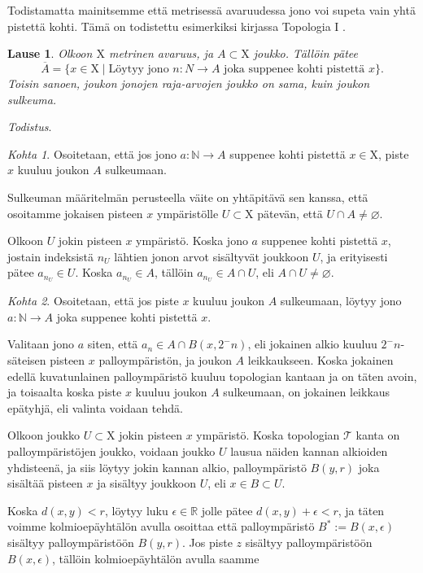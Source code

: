\documentclass[12pt,a4paper,leqno]{report}
\newcommand{\R}{\mathbb{R}}
\newcommand{\N}{\mathbb{N}}
\newcommand{\X}{\mathrm{X}}
\newcommand{\T}{\mathcal{T}}
\theoremstyle{plain}
\newtheorem{lause}[equation]{Lause}
\theoremstyle{definition}
\theoremstyle{remark}
\begin{document}
Todistamatta mainitsemme että metrisessä avaruudessa jono voi supeta vain yhtä pistettä kohti. Tämä on todistettu esimerkiksi kirjassa Topologia I \cite{Topo1}.

\begin{lause}
Olkoon $\X$ metrinen avaruus, ja $A \subset \X$ joukko. Tällöin pätee
\begin{equation}
\overline{A} = \{x \in \X \mid \text{Löytyy jono } n : N \to A \text{ joka suppenee kohti pistettä } x\}\text{.}
\end{equation}
Toisin sanoen, joukon jonojen raja-arvojen joukko on sama, kuin joukon sulkeuma.
\end{lause}

\noindent\emph{Todistus}.

\emph{Kohta 1}. Osoitetaan, että jos jono $a : \N \to A$ suppenee kohti pistettä $x \in \X$, piste $x$ kuuluu joukon $A$ sulkeumaan.

Sulkeuman määritelmän perusteella väite on yhtäpitävä sen kanssa, että osoitamme jokaisen pisteen $x$ ympäristölle $U \subset \X$ pätevän, että $U \cap A \not= \varnothing$.

Olkoon $U$ jokin pisteen $x$ ympäristö. Koska jono $a$ suppenee kohti pistettä $x$, jostain indeksistä $n_U$ lähtien jonon arvot sisältyvät joukkoon $U$, ja erityisesti pätee $a_{n_U} \in U$. Koska $a_{n_U} \in A$, tällöin $a_{n_U} \in A \cap U$, eli $A \cap U \not= \varnothing$.

\emph{Kohta 2}. Osoitetaan, että jos piste $x$ kuuluu joukon $A$ sulkeumaan, löytyy jono $a : \N \to A$ joka suppenee kohti pistettä $x$.

Valitaan jono $a$ siten, että $a_n \in A \cap B(x, 2^-n)$, eli jokainen alkio kuuluu $2^-n$-säteisen pisteen $x$ palloympäristön, ja joukon $A$ leikkaukseen. Koska jokainen edellä kuvatunlainen palloympäristö kuuluu topologian kantaan ja on täten avoin, ja toisaalta koska piste $x$ kuuluu joukon $A$ sulkeumaan, on jokainen leikkaus epätyhjä, eli valinta voidaan tehdä.

Olkoon joukko $U \subset \X$ jokin pisteen $x$ ympäristö. Koska topologian $\T$ kanta on palloympäristöjen joukko, voidaan joukko $U$ lausua näiden kannan alkioiden yhdisteenä, ja siis löytyy jokin kannan alkio, palloympäristö $B(y,r)$ joka sisältää pisteen $x$ ja sisältyy joukkoon $U$, eli $x \in B \subset U$.

Koska $d(x,y) < r$, löytyy luku $\epsilon \in \R$ jolle pätee $d(x,y) + \epsilon < r$, ja täten voimme kolmioepäyhtälön avulla osoittaa että palloympäristö $B^* := B(x,\epsilon)$ sisältyy palloympäristöön $B(y,r)$. Jos piste $z$ sisältyy palloympäristöön $B(x,\epsilon)$, tällöin kolmioepäyhtälön avulla saamme
\end{document}
